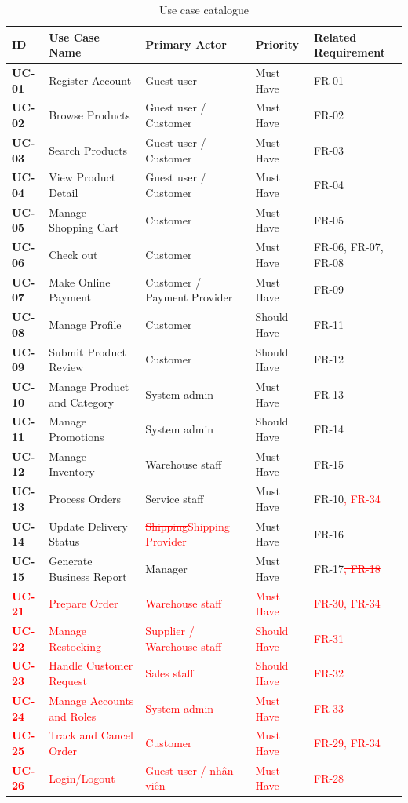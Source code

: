 \documentclass[12pt,a4paper,oneside]{report}
\newif\ifmark \marktrue
\newcommand{\chg}[1]{\ifmark\textcolor{red}{#1}\else #1\fi}
\newcommand{\del}[1]{\ifmark\textcolor{red}{\sout{#1}}\fi}
\begin{document}
\begin{longtable}{p{1.6cm}p{4.8cm}p{3.8cm}p{2.6cm}p{2.8cm}}
\caption{Use case catalogue}\\
\toprule
\textbf{ID} & \textbf{Use Case Name} & \textbf{Primary Actor} & \textbf{Priority} & \textbf{Related Requirement} \\
\midrule
\endhead
\bottomrule
\endlastfoot
\textbf{UC-01} & Register Account & Guest user & Must Have & FR-01 \\
\textbf{UC-02} & Browse Products & Guest user / Customer & Must Have & FR-02 \\
\textbf{UC-03} & Search Products & Guest user / Customer & Must Have & FR-03 \\
\textbf{UC-04} & View Product Detail & Guest user / Customer & Must Have & FR-04 \\
\textbf{UC-05} & Manage Shopping Cart & Customer & Must Have & FR-05 \\
\textbf{UC-06} & Check out & Customer & Must Have & FR-06, FR-07, FR-08 \\
\textbf{UC-07} & Make Online Payment & Customer / Payment Provider & Must Have & FR-09 \\
\textbf{UC-08} & Manage Profile & Customer & Should Have & FR-11 \\
\textbf{UC-09} & Submit Product Review & Customer & Should Have & FR-12 \\
\textbf{UC-10} & Manage Product and Category & System admin & Must Have & FR-13 \\
\textbf{UC-11} & Manage Promotions & System admin & Should Have & FR-14 \\
\textbf{UC-12} & Manage Inventory & Warehouse staff & Must Have & FR-15 \\
\textbf{UC-13} & Process Orders & Service staff & Must Have & FR-10\chg{, FR-34} \\
\textbf{UC-14} & Update Delivery Status & \del{Shipping}\chg{Shipping Provider} & Must Have & FR-16 \\
\textbf{UC-15} & Generate Business Report & Manager & Must Have & FR-17\del{, FR-18} \\
\chg{\textbf{UC-21}} & \chg{Prepare Order} & \chg{Warehouse staff} & \chg{Must Have} & \chg{FR-30, FR-34} \\
\chg{\textbf{UC-22}} & \chg{Manage Restocking} & \chg{Supplier / Warehouse staff} & \chg{Should Have} & \chg{FR-31} \\
\chg{\textbf{UC-23}} & \chg{Handle Customer Request} & \chg{Sales staff} & \chg{Should Have} & \chg{FR-32} \\
\chg{\textbf{UC-24}} & \chg{Manage Accounts and Roles} & \chg{System admin} & \chg{Must Have} & \chg{FR-33} \\
\chg{\textbf{UC-25}} & \chg{Track and Cancel Order} & \chg{Customer} & \chg{Must Have} & \chg{FR-29, FR-34} \\
\chg{\textbf{UC-26}} & \chg{Login/Logout} & \chg{Guest user / nhân viên} & \chg{Must Have} & \chg{FR-28} \\
\end{longtable}
\end{document}
